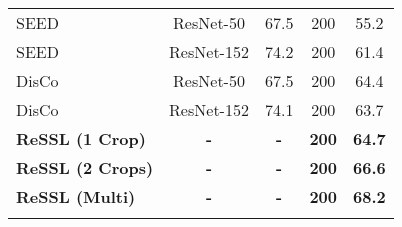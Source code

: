 \documentclass{article}
\newcommand{\<}{\left\langle}
\renewcommand{\>}{\right\rangle}
\begin{document}
\begin{table}[h]
\begin{tabular}{l c c c c}
SEED \cite{seed} & ResNet-50 & 67.5 & 200 & 55.2 \\
SEED \cite{seed} & ResNet-152 & 74.2 & 200 & 61.4 \\
DisCo \cite{disco} & ResNet-50 & 67.5 & 200 & 64.4 \\
DisCo \cite{disco} & ResNet-152 & 74.1 & 200 & 63.7 \\ 
\textbf{ReSSL (1 Crop)}  & \textbf{-} & \textbf{-} & \textbf{200} & \textbf{64.7} \\
\textbf{ReSSL (2 Crops)} & \textbf{-} & \textbf{-} & \textbf{200} & \textbf{66.6} \\
\textbf{ReSSL (Multi)}   & \textbf{-} & \textbf{-} & \textbf{200} & \textbf{68.2} \\ 
\bottomrule
\vspace{-20pt}
\end{tabular}
\end{table}
\end{document}
